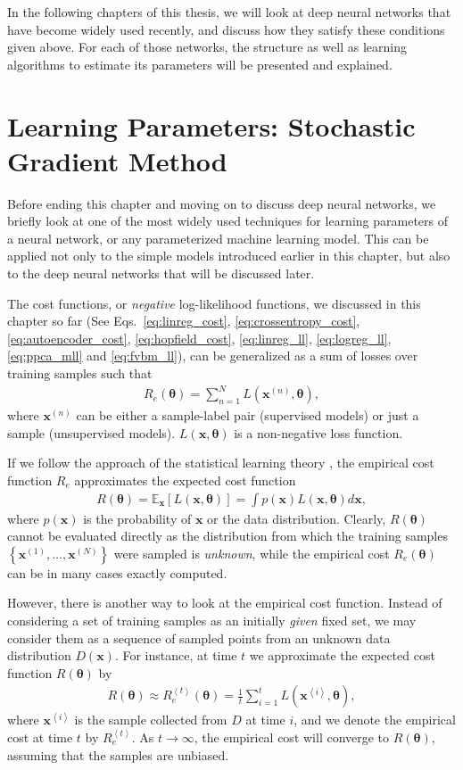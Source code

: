 \documentclass[dissertation,nocontribution,draft*]{aaltoseries}
\newcommand{\qexp}[1]{\left<#1\right>}
\newcommand{\vect}[1]{\mathbf{#1}}
\newcommand{\vects}[1]{\boldsymbol{#1}}
\newcommand{\vx}[0]{\vect{x}}
\newcommand{\TT}[0]{{\vects{\theta}}}
\newcommand{\E}[0]{\mathbb{E}}
\begin{document}
In the following chapters of this thesis, we will look at
deep neural networks that have become widely used recently,
and discuss how they satisfy these conditions given above.
For each of those networks, the structure as well as
learning algorithms to estimate its parameters will be
presented and explained.

\section{Learning Parameters: Stochastic Gradient Method}
\label{sec:stochastic_grad}

Before ending this chapter and moving on to discuss deep
neural networks, we briefly look at one of the most widely
used techniques for learning parameters of a neural network,
or any parameterized machine learning model.  This can be
applied not only to the simple models introduced
earlier in this chapter, but also to the deep neural networks
that will be discussed later.

The cost functions, or \textit{negative} log-likelihood
functions, we discussed in this chapter so far (See
Eqs.~\eqref{eq:linreg_cost}, \eqref{eq:crossentropy_cost},
\eqref{eq:autoencoder_cost}, \eqref{eq:hopfield_cost},
\eqref{eq:linreg_ll}, \eqref{eq:logreg_ll},
\eqref{eq:ppca_mll} and \eqref{eq:fvbm_ll}), can be
generalized as a sum of losses over training samples such
that
\begin{align}
    \label{eq:slt_emp_cost}
    R_e(\TT) = \sum_{n=1}^N L(\vx^{(n)}, \TT),
\end{align}
where $\vx^{(n)}$ can be either a sample-label pair
(supervised models) or just a sample (unsupervised models).
$L(\vx, \TT)$ is a non-negative loss function.

If we follow the approach of the statistical learning theory
\citep[see, e.g.][]{Vapnik1995}, the empirical cost function
$R_e$ approximates the expected cost function 
\begin{align}
    \label{eq:slt_exp_cost}
    R(\TT) = \E_{\vx} \left[ L(\vx, \TT) \right] = \int
    p(\vx) L(\vx, \TT) d\vx,
\end{align}
where $p(\vx)$ is the probability of $\vx$ or the data
distribution. Clearly, $R(\TT)$ cannot be evaluated directly
as the distribution from which the training samples $\left\{
\vx^{(1)}, \dots, \vx^{(N)} \right\}$ were sampled is
\textit{unknown}, while the empirical cost $R_e(\TT)$
can be in many cases exactly computed.

However, there is another way to look at the empirical cost
function. Instead of considering a set of training samples
as an initially \textit{given} fixed set, we may consider
them as a sequence of sampled points from an unknown
data distribution $D(\vx)$. For instance, at time $t$ we
approximate the expected cost function $R(\TT)$ by
\begin{align*}
    R(\TT) \approx R_e^{\qexp{t}}(\TT) = \frac{1}{t}
    \sum_{i=1}^t L(\vx^{\qexp{i}}, \TT),
\end{align*}
where $\vx^{\qexp{i}}$ is the sample collected from $D$ at time
$i$, and we denote the empirical cost at time $t$ by
$R_e^{\qexp{t}}$. As $t\to\infty$, the empirical cost will
converge to $R(\TT)$, assuming that the samples are unbiased.
\end{document}

